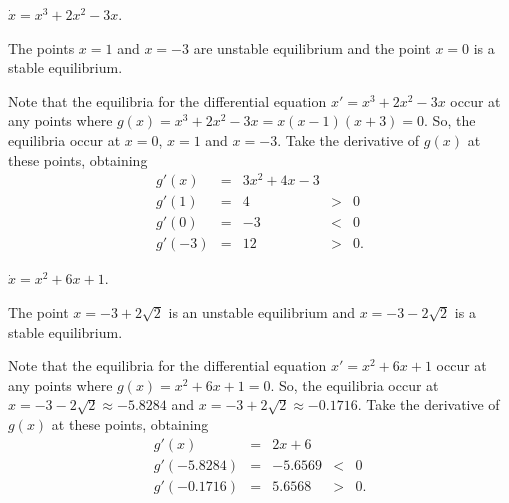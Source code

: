 \documentclass{ximera}
\begin{document}
\begin{computerExercise} \label{c3.3.6C}
$\dot{x} = x^3 + 2x^2 - 3x$.

\begin{solution}

\ans The points $x=1$ and $x = -3$ are unstable equilibrium and the point 
$x = 0$ is a stable equilibrium.

\soln Note that the equilibria for the differential equation
$x' = x^3 + 2x^2 - 3x$ occur at any points where
$g(x) = x^3 + 2x^2 - 3x = x(x - 1)(x + 3) = 0$.
So, the equilibria occur at $x=0$, $x = 1$ and $x = -3$.  Take the
derivative of $g(x)$ at these points, obtaining
\[
\begin{array}{rcccl}
g'(x) & = & 3x^2+4x-3 \\
g'(1) & = & 4 & > & 0 \\
g'(0) & = & -3 & < & 0\\
g'(-3) & = & 12 & > & 0.\end{array}
\]

\end{solution}
\end{computerExercise}
\begin{computerExercise} \label{c3.3.6D}
$\dot{x} = x^2 + 6x + 1$.

\begin{solution}

\ans The point $x = -3+2\sqrt{2}$ is an unstable equilibrium and 
$x = -3-2\sqrt{2}$ is a stable equilibrium.

\soln Note that the equilibria for the differential equation
$x' = x^2 + 6x + 1$ occur at any points where
$g(x) = x^2 + 6x + 1 = 0$.  So, the equilibria occur at $x =
-3-2\sqrt{2}\approx -5.8284$ and $x = -3+2\sqrt{2}\approx -0.1716$.  Take the
derivative of $g(x)$ at these points, obtaining
\[
\begin{array}{rcccl}
g'(x) & = & 2x + 6 \\
g'(-5.8284) & = & -5.6569 & < & 0 \\
g'(-0.1716) & = & 5.6568 & > & 0.\end{array}
\]

\end{solution}
\end{computerExercise}
\end{document}
